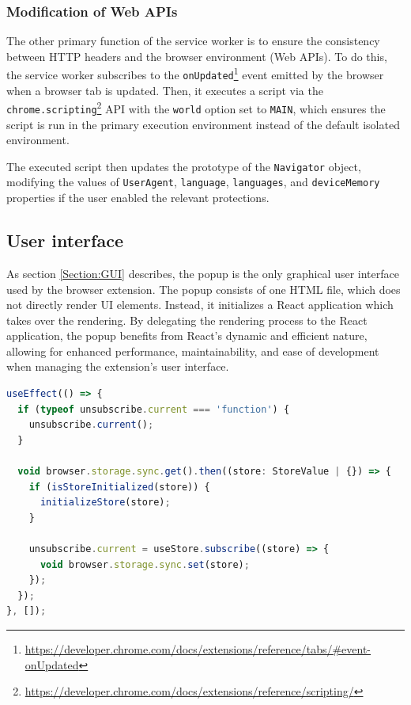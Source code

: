 \subsubsection{Modification of Web APIs}
\label{SubSubSection:APIModifications}

The other primary function of the service worker is to ensure the consistency between HTTP headers and the browser environment (Web APIs). To do this, the service worker subscribes to the \texttt{onUpdated}\footnote{\url{https://developer.chrome.com/docs/extensions/reference/tabs/\#event-onUpdated}} event emitted by the browser when a browser tab is updated. Then, it executes a script via the \texttt{chrome.scripting}\footnote{\url{https://developer.chrome.com/docs/extensions/reference/scripting/}} API with the \texttt{world} option set to \texttt{MAIN}, which ensures the script is run in the primary execution environment instead of the default isolated environment.

The executed script then updates the prototype of the \texttt{Navigator} object, modifying the values of \texttt{UserAgent}, \texttt{language}, \texttt{languages}, and \texttt{deviceMemory} properties if the user enabled the relevant protections.

\subsection{User interface}

As section \ref{Section:GUI} describes, the popup is the only graphical user interface used by the browser extension. The popup consists of one HTML file, which does not directly render UI elements. Instead, it initializes a React application which takes over the rendering. By delegating the rendering process to the React application, the popup benefits from React's dynamic and efficient nature, allowing for enhanced performance, maintainability, and ease of development when managing the extension's user interface.

\bigbreak

\begin{lstlisting}[language={TypeScript}, caption={A code snippet in which the React application initializes its storage and creates a subscription for future changes.}]
useEffect(() => {
  if (typeof unsubscribe.current === 'function') {
    unsubscribe.current();
  }

  void browser.storage.sync.get().then((store: StoreValue | {}) => {
    if (isStoreInitialized(store)) {
      initializeStore(store);
    }

    unsubscribe.current = useStore.subscribe((store) => {
      void browser.storage.sync.set(store);
    });
  });
}, []);
\end{lstlisting}

